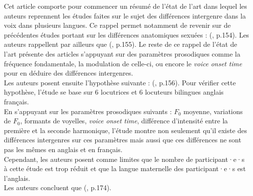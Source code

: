 Cet article comporte pour commencer un résumé de l'état de l'art dans lequel les auteurs reprennent les études faites sur le sujet des différences intergenre dans la voix dans plusieurs langues.
Ce rappel permet notamment de revenir sur de précédentes études portant sur les différences anatomiques sexuées :  (\cite{Pep20}, p.154).
Les auteurs rappellent par ailleurs que  (\cite{Pep20}, p.155). 
Le reste de ce rappel de l'état de l'art présente des articles s'appuyant sur des paramètres prosodiques comme la fréquence fondamentale, la modulation de celle-ci, ou encore le \textit{voice onset time} pour en déduire des différences intergenres.\\
Les auteurs posent ensuite l'hypothèse suivante :  (\cite{Pep20}, p.156).
Pour vérifier cette hypothèse, l'étude se base sur 6 locutrices et 6 locuteurs bilingues anglais français.\\
En s'appuyant sur les paramètres prosodiques suivants : $F_0$ moyenne, variations de $F_0$, formants de voyelles, \textit{voice onset time}, différence d'intensité entre la première et la seconde harmonique, l'étude montre non seulement qu'il existe des différences intergenres sur ces paramètres mais aussi que ces différences ne sont pas les mêmes en anglais et en français.\\
Cependant, les auteurs posent comme limites que le nombre de participant·e·s à cette étude est trop réduit et que la langue maternelle des participant·e·s est l'anglais.\\

Les auteurs concluent que  (\cite{Pep20}, p.174).\\
